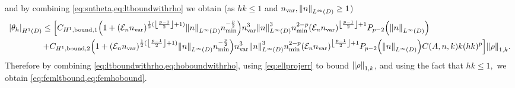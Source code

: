 and by combining \cref{eq:sntheta,eq:ltboundwithrho} we obtain (as $hk \leq 1$ and $\nvar,\NLiD{n} \geq 1$)
\begin{align}
\SNHoD{\thetah} &\leq
\mleft[\CHoboundo  \mleft(1+\mleft(\En\nvar\mright)^{\half(\floor{\frac{p-1}2}+1)}\NLiD{n}\nmin^{-\frac{p}2}\mright)\nvar^3\NLiD{n}^3\nmin^{2-p} \mleft(\En \nvar\mright)^{\floor{\frac{p-1}2}+1}\Pfn{p-2}\mleft(\NLiD{n}\mright)\mright.\nonumber\\
&\mleft.+\CHoboundt \mleft(1+\mleft(\En\nvar\mright)^{\half(\floor{\frac{p-1}2}+1)}\NLiD{n}\nmin^{-\frac{p}2}\mright)\nvar^3\NLiD{n}^3\nmin^{2-p} \mleft(\En \nvar\mright)^{\floor{\frac{p-1}2}+1} \Pfn{p-2}\mleft(\NLiD{n}\mright)\CAnk k(hk)^p\mright]\NW{\rho}.\label{eq:hoboundwithrho}
\end{align}
Therefore by combining \cref{eq:ltboundwithrho,eq:hoboundwithrho}, using \cref{eq:ellprojerr} to bound $\NW{\rho}$, and using the fact that $hk \leq 1,$ we obtain \cref{eq:femltbound,eq:femhobound}.
\epf


